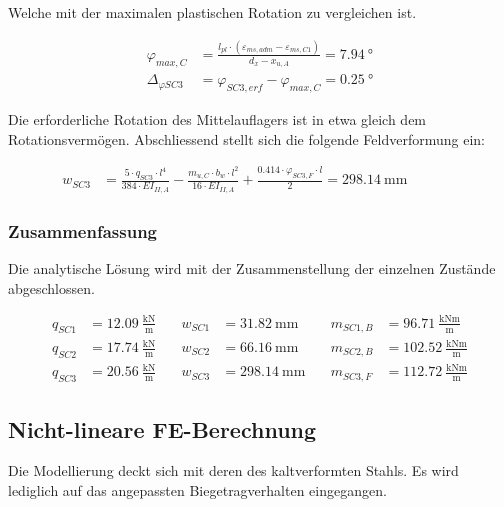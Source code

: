 \documentclass[
  11pt,
  letterpaper,
]{scrreprt}
\begin{document}
Welche mit der maximalen plastischen Rotation zu vergleichen ist.

\[
\begin{aligned}
\varphi_{max , C}& = \frac{l_{pl} \cdot \left(\varepsilon_{m s , adm} - \varepsilon_{m s , C1}\right)}{d_{x} - x_{u , A}} = 7.94 \ \mathrm{°} \\ 
\Delta_{\varphi SC3}& = \varphi_{SC3 , erf} - \varphi_{max , C} = 0.25 \ \mathrm{°} \end{aligned}
\]

Die erforderliche Rotation des Mittelauflagers ist in etwa gleich dem
Rotationsvermögen. Abschliessend stellt sich die folgende Feldverformung
ein:

\[
\begin{aligned}
w_{SC3}& = \frac{5 \cdot q_{SC3} \cdot l^{4}}{384 \cdot EI_{II , A}} - \frac{m_{u , C} \cdot b_{w} \cdot l^{2}}{16 \cdot EI_{II , A}} + \frac{0.414 \cdot \varphi_{SC3 , F} \cdot l}{2} = 298.14 \ \mathrm{mm} \quad &  \quad &  
 \end{aligned}
\]

\subsubsection{Zusammenfassung}\label{zusammenfassung-4}

Die analytische Lösung wird mit der Zusammenstellung der einzelnen
Zustände abgeschlossen.

\[
\begin{aligned}
q_{SC1}& = 12.09 \ \frac{\mathrm{kN}}{\mathrm{m}} \quad & w_{SC1}& = 31.82 \ \mathrm{mm} \quad & m_{SC1 , B}& = 96.71 \ \frac{\mathrm{kNm}}{\mathrm{m}} \\ 
q_{SC2}& = 17.74 \ \frac{\mathrm{kN}}{\mathrm{m}} \quad & w_{SC2}& = 66.16 \ \mathrm{mm} \quad & m_{SC2 , B}& = 102.52 \ \frac{\mathrm{kNm}}{\mathrm{m}} \\ 
q_{SC3}& = 20.56 \ \frac{\mathrm{kN}}{\mathrm{m}} \quad & w_{SC3}& = 298.14 \ \mathrm{mm} \quad & m_{SC3 , F}& = 112.72 \ \frac{\mathrm{kNm}}{\mathrm{m}} \end{aligned}
\]

\subsection{Nicht-lineare
FE-Berechnung}\label{nicht-lineare-fe-berechnung-1}

Die Modellierung deckt sich mit deren des kaltverformten Stahls. Es wird
lediglich auf das angepassten Biegetragverhalten eingegangen.
\end{document}
